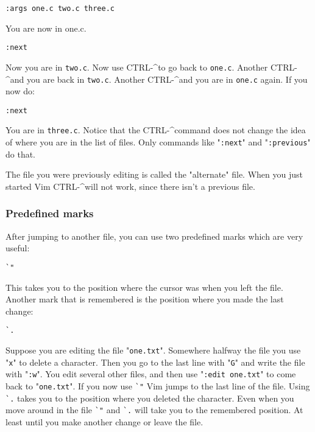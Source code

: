  \begin{Verbatim}[samepage=true]
 :args one.c two.c three.c
 \end{Verbatim}

You are now in one.c.

 \begin{Verbatim}[samepage=true]
 :next
 \end{Verbatim}

Now you are in \verb!two.c!.
Now use CTRL-\textasciicircum to go back to \verb!one.c!.
Another CTRL-\textasciicircum and you are back in \verb!two.c!.
Another CTRL-\textasciicircum and you are in \verb!one.c! again.
If you now do:

 \begin{Verbatim}[samepage=true]
 :next
 \end{Verbatim}

You are in \verb!three.c!.
Notice that the CTRL-\textasciicircum command does not change the idea of where you are in the list of files.
Only commands like "\verb!:next!" and "\verb!:previous!" do that.

The file you were previously editing is called the "alternate" file.
When you just started Vim CTRL-\textasciicircum will not work, since there isn't a previous file.

\subsubsection{Predefined marks}
After jumping to another file, you can use two predefined marks which are very useful:

 \begin{Verbatim}[samepage=true]
 `"
 \end{Verbatim}

This takes you to the position where the cursor was when you left the file.
Another mark that is remembered is the position where you made the last change:

 \begin{Verbatim}[samepage=true]
 `.
 \end{Verbatim}

Suppose you are editing the file "\verb!one.txt!".
Somewhere halfway the file you use "\verb!x!" to delete a character.
Then you go to the last line with "\verb!G!" and write the file with "\verb!:w!".
You edit several other files, and then use "\verb!:edit one.txt!" to come back to "\verb!one.txt!".
If you now use \verb!`"! Vim jumps to the last line of the file.
Using \verb!`.! takes you to the position where you deleted the character.
Even when you move around in the file \verb!`"! and \verb!`.! will take you to the remembered position.
At least until you make another change or leave the file.

